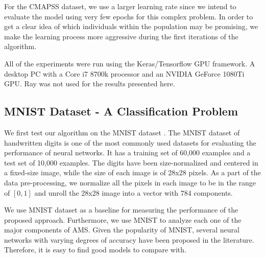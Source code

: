 \documentclass[12pt]{elsart}%
\begin{document}
\begin{table}[!htb]
\begin{center}
\end{center}
\caption{Training parameters for each of the used datasets.}
\label{table:training_params}
\end{table}

For the CMAPSS dataset, we use a larger learning rate since we intend to evaluate the model using very few epochs for this complex problem. In order to get a clear idea of which individuals within the population may be promising, we make the learning process more aggressive during the first iterations of the algorithm. 

All of the experiments were run using the Keras/Tensorflow GPU framework. A desktop PC with a Core i7 8700k processor and an NVIDIA GeForce 1080Ti GPU. Ray was not used for the results presented here.

\subsection{MNIST Dataset - A Classification Problem}

We first test our algorithm on the MNIST dataset \cite{Lecun1998}. The MNIST dataset of handwritten digits is one of the most commonly used datasets for evaluating the performance of neural networks. It has a training set of 60,000 examples and a test set of 10,000 examples. The digits have been size-normalized and centered in a fixed-size image, while the size of each image is of 28x28 pixels. As a part of the data pre-processing, we normalize all the pixels in each image to be in the range of $[0,1]$ and unroll the 28x28 image into a vector with 784 components.

We use MNIST dataset as a baseline for measuring the performance of the proposed approach. Furthermore, we use MNIST to analyze each one of the major components of AMS. Given the popularity of MNIST, several neural networks with varying degrees of accuracy have been proposed in the literature. Therefore, it is easy to find good models to compare with. 
\end{document}
